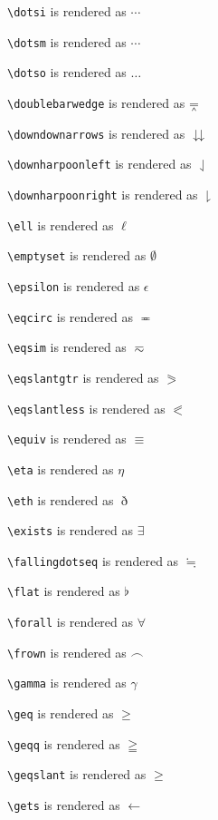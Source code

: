 \texttt{\textbackslash dotsi} is rendered as $\dotsi$

\texttt{\textbackslash dotsm} is rendered as $\dotsm$

\texttt{\textbackslash dotso} is rendered as $\dotso$

\texttt{\textbackslash doublebarwedge} is rendered as $\doublebarwedge$

\texttt{\textbackslash downdownarrows} is rendered as $\downdownarrows$

\texttt{\textbackslash downharpoonleft} is rendered as $\downharpoonleft$

\texttt{\textbackslash downharpoonright} is rendered as $\downharpoonright$

\texttt{\textbackslash ell} is rendered as $\ell$

\texttt{\textbackslash emptyset} is rendered as $\emptyset$

\texttt{\textbackslash epsilon} is rendered as $\epsilon$

\texttt{\textbackslash eqcirc} is rendered as $\eqcirc$

\texttt{\textbackslash eqsim} is rendered as $\eqsim$

\texttt{\textbackslash eqslantgtr} is rendered as $\eqslantgtr$

\texttt{\textbackslash eqslantless} is rendered as $\eqslantless$

\texttt{\textbackslash equiv} is rendered as $\equiv$

\texttt{\textbackslash eta} is rendered as $\eta$

\texttt{\textbackslash eth} is rendered as $\eth$

\texttt{\textbackslash exists} is rendered as $\exists$

\texttt{\textbackslash fallingdotseq} is rendered as $\fallingdotseq$

\texttt{\textbackslash flat} is rendered as $\flat$

\texttt{\textbackslash forall} is rendered as $\forall$

\texttt{\textbackslash frown} is rendered as $\frown$

\texttt{\textbackslash gamma} is rendered as $\gamma$

\texttt{\textbackslash geq} is rendered as $\geq$

\texttt{\textbackslash geqq} is rendered as $\geqq$

\texttt{\textbackslash geqslant} is rendered as $\geqslant$

\texttt{\textbackslash gets} is rendered as $\gets$

